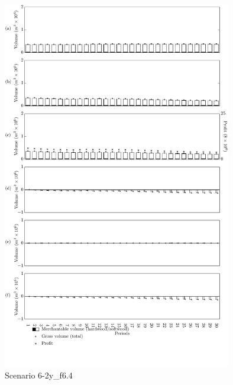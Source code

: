 \begin{figure}[h]
  \centering
  \includegraphics[width=10cm]{images/appendix/s6-2y_test090}
  \caption{Scenario 6-2y\_f6.4}
  \label{fig:s6-2y_test090}
\end{figure}

